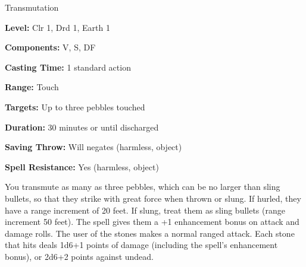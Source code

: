 
Transmutation

\textbf{Level:} Clr 1, Drd 1, Earth 1

\textbf{Components:} V, S, DF

\textbf{Casting Time:} 1 standard action

\textbf{Range:} Touch

\textbf{Targets:} Up to three pebbles touched

\textbf{Duration:} 30 minutes or until discharged

\textbf{Saving Throw:} Will negates (harmless, object)

\textbf{Spell Resistance:} Yes (harmless, object)

You transmute as many as three pebbles, which can be no larger than sling bullets, 
so that they strike with great force when thrown or slung. If hurled, they have 
a range increment of 20 feet. If slung, treat them as sling bullets (range increment 
50 feet). The spell gives them a +1 enhancement bonus on attack and damage rolls. 
The user of the stones makes a normal ranged attack. Each stone that hits 
deals 1d6+1 points of damage (including the spell's enhancement bonus), or 2d6+2 
points against undead.

